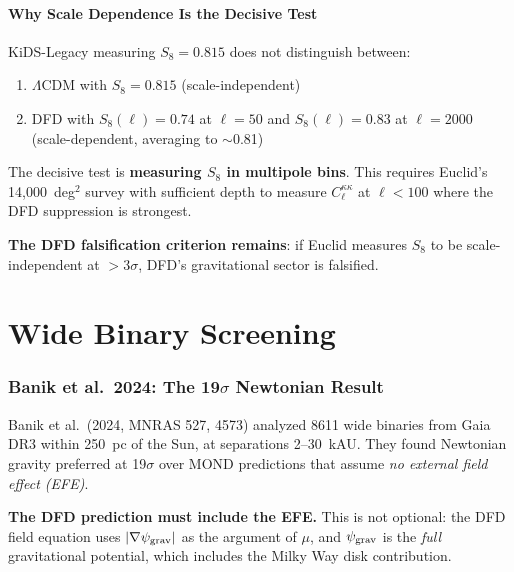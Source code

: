 \documentclass[11pt,a4paper]{article}
\newcommand{\LCDM}{$\Lambda$CDM}
\begin{document}
\subsection{Why Scale Dependence Is the Decisive Test}

KiDS-Legacy measuring $S_8 = 0.815$ does not distinguish between:
\begin{enumerate}
\item \LCDM{} with $S_8 = 0.815$ (scale-independent)
\item DFD with $S_8(\ell) = 0.74$ at $\ell = 50$ and $S_8(\ell) = 0.83$
  at $\ell = 2000$ (scale-dependent, averaging to $\sim$0.81)
\end{enumerate}

The decisive test is \textbf{measuring $S_8$ in multipole bins}. This
requires Euclid's 14,000~deg$^2$ survey with sufficient depth to measure
$C_\ell^{\kappa\kappa}$ at $\ell < 100$ where the DFD suppression is
strongest.

\textbf{The DFD falsification criterion remains}: if Euclid measures
$S_8$ to be scale-independent at $> 3\sigma$, DFD's gravitational
sector is falsified.


\part{Wide Binary Screening}
\label{part:wb}

\section{Banik et al.\ 2024: The 19$\sigma$ Newtonian Result}

\begin{tcolorbox}[colback=blue!3!white, colframe=blue!60!black,
  title=\textbf{Finding \thesection: DFD wide binary prediction with
  external field effect}\label{find:wb}]

Banik et al.\ (2024, MNRAS 527, 4573) analyzed 8611 wide binaries from
Gaia DR3 within 250~pc of the Sun, at separations 2--30~kAU. They found
Newtonian gravity preferred at 19$\sigma$ over MOND predictions that
assume \emph{no external field effect (EFE)}.

\textbf{The DFD prediction must include the EFE.} This is not optional:
the DFD field equation uses $|\nabla\psi_{\rm grav}|$ as the argument
of $\mu$, and $\psi_{\rm grav}$ is the \emph{full} gravitational
potential, which includes the Milky Way disk contribution.
\end{tcolorbox}
\end{document}
